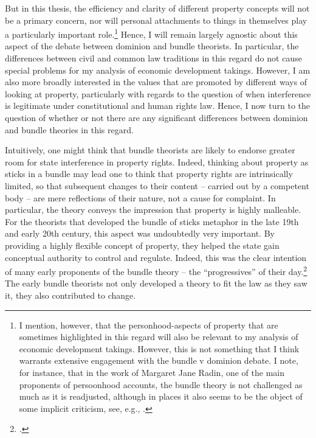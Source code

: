But in this thesis, the efficiency and clarity of different property concepts will not be a primary concern, nor will personal attachments to things in themselves play a particularly important role.\footnote{I mention, however, that the personhood-aspects of property that are sometimes highlighted in this regard will also be relevant to my analysis of economic development takings. However, this is not something that I think warrants extensive engagement with the bundle v dominion debate. I note, for instance, that in the work of Margaret Jane Radin, one of the main proponents of persoonhood accounts, the bundle theory is not challenged as much as it is readjusted, although in places it also seems to be the object of some implicit criticism, see, e.g., \cite[127-130]{radin93}.}
Hence, I will remain largely agnostic about this aspect of the debate between dominion and bundle theorists. In particular, the differences between civil and common law traditions in this regard do not cause special problems for my analysis of economic development takings. However, I am also more broadly interested in the values that are promoted by different ways of looking at property, particularly with regards to the question of when interference is legitimate under constitutional and human rights law. Hence, I  now turn to the question of whether or not there are any significant differences between dominion and bundle theories in this regard.

Intuitively, one might think that bundle theorists are likely to endorse greater room for state interference in property rights. Indeed, thinking about property as sticks in a bundle may lead one to think that property rights are intrinsically limited, so that subsequent changes to their content -- carried out by a competent body -- are mere reflections of their nature, not a cause for complaint. In particular, the theory conveys the impression that property is highly malleable. For the theorists that developed the bundle of sticks metaphor in the late 19th and early 20th century, this aspect was undoubtedly very important. By providing a highly flexible concept of property, they helped the state gain conceptual authority to control and regulate. Indeed, this was the clear intention of many early proponents of the bundle theory -- the ``progressives'' of their day.\footcite[195]{klein11} The early bundle theorists not only developed a theory to fit the law as they saw it, they also contributed to change.

